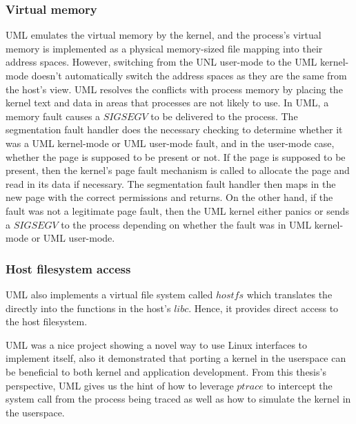 \subsubsection{Virtual memory}

UML emulates the virtual memory by the kernel, and the process's virtual memory is implemented as a physical memory-sized file mapping into their address spaces. However, switching from the UNL user-mode to the UML kernel-mode doesn't automatically switch the address spaces as they are the same from the host's view. UML resolves the conflicts with process memory by placing the kernel text and data in areas that processes are not likely to use. In UML, a memory fault causes a $SIGSEGV$ to be delivered to the process. The segmentation fault handler does the necessary checking to determine whether it was a UML kernel-mode or UML user-mode fault, and in the user-mode case, whether the page is supposed to be present or not. If the page is supposed to be present, then the kernel's page fault mechanism is called to allocate the page and read in its data if necessary. The segmentation fault handler then maps in the new page with the correct permissions and returns. On the other hand, if the fault was not a legitimate page fault, then the UML kernel either panics or sends a $SIGSEGV$ to the process depending on whether the fault was in UML kernel-mode or UML user-mode.  

\subsubsection{Host filesystem access}

UML also implements a virtual file system called $hostfs$ which translates the directly into the functions in the host's $libc$. Hence, it provides direct access to the host filesystem.

UML was a nice project showing a novel way to use Linux interfaces to implement itself, also it demonstrated that porting a kernel in the userspace can be beneficial to both kernel and application development. From this thesis's perspective, UML gives us the hint of how to leverage $ptrace$ to intercept the system call from the process being traced as well as how to simulate the kernel in the userspace.




